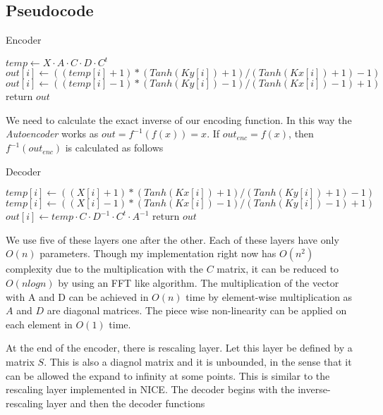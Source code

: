 \documentclass{article}
\begin{document}
\subsection{Pseudocode}
\begin{algorithm}
  \caption{Encoder}\label{neis}
  \begin{algorithmic}[1]
    \State $temp \gets X\cdot A\cdot C\cdot D\cdot C^t$
     
    \State $out[i]  \gets ( (temp[i]+1)*(Tanh(Ky[i])+1)/(Tanh(Kx[i])+1) - 1 )  $
    \Else 
    \State $out[i]  \gets ( (temp[i]-1)*(Tanh(Ky[i])-1)/(Tanh(Kx[i])-1) + 1 )$
    \EndIf
    \EndFor
    \State return $out$
    \EndProcedure
  \end{algorithmic}
\end{algorithm}
We need to calculate the exact inverse of our encoding function. In this way the \textit{Autoencoder} works as $ out = f^{-1}(f(x)) = x$. If $out_{enc} = f(x)$, then $f^{-1}(out_{enc})$ is calculated as follows
\begin{algorithm}
  \caption{Decoder}\label{neis}
  \begin{algorithmic}[1]
     
    \State $temp[i]  \gets ( (X[i]+1)*(Tanh(Kx[i])+1)/(Tanh(Ky[i])+1) - 1 )  $
    \Else 
    \State $temp[i]  \gets ( (X[i]-1)*(Tanh(Kx[i])-1)/(Tanh(Ky[i])-1) + 1 )$
    \EndIf
    \EndFor
    \State $out[i] \gets  temp\cdot C \cdot D^{-1} \cdot C^t \cdot A^{-1}$
    \State return $out$
    \EndProcedure
  \end{algorithmic}
\end{algorithm}
We use five of these layers one after the other. Each of these layers have only $O(n)$ parameters. Though my implementation right now has $O(n^2)$ complexity due to the multiplication with the $C$ matrix, it can be reduced to $O(nlogn)$ by using an FFT like algorithm. The multiplication of the vector with A and D can be achieved in $O(n)$ time by element-wise multiplication as $A$ and $D$ are diagonal matrices. The piece wise non-linearity can be applied on each element in $O(1)$ time.

At the end of the encoder, there is rescaling layer. Let this layer be defined by a matrix $S$. This is also a diagnol matrix and it is unbounded, in the sense that it can be allowed the expand to infinity at some points. This is similar to the rescaling layer implemented in NICE. The decoder begins with the inverse-rescaling layer and then the decoder functions
\end{document}
